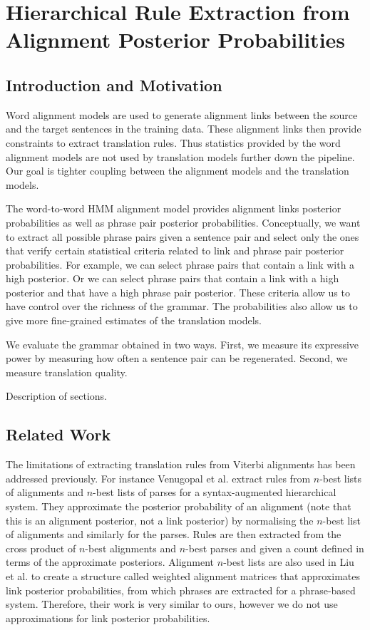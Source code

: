 \chapter{Hierarchical Rule Extraction from Alignment Posterior Probabilities}
\label{chap:extractionFromPosterior}

\section{Introduction and Motivation}
\label{sec:intro}

Word alignment models are used to generate alignment links between
the source and the target sentences in the training data. These
alignment links then provide constraints to extract translation
rules. Thus statistics provided by the word alignment models are
not used by translation models further down the pipeline.
Our goal is tighter coupling between the alignment models and the
translation models.

The word-to-word HMM alignment model provides alignment links
posterior probabilities as well as phrase pair posterior
probabilities. Conceptually, we want to extract all possible phrase pairs given
a sentence pair and select only the ones that verify certain statistical
criteria related to link and phrase pair posterior probabilities. For
example, we can select phrase pairs that contain a link with a high posterior.
Or we can select phrase pairs that contain a link with a high posterior
and that have a high phrase pair posterior. These criteria allow us
to have control over the richness of the grammar. The probabilities
also allow us to give more fine-grained estimates of the translation
models.

We evaluate the grammar obtained in two ways. First, we measure
its expressive power by measuring how often a sentence pair
can be regenerated. Second, we measure translation quality.

Description of sections.

\section{Related Work}

  The limitations of extracting translation rules from Viterbi alignments has been addressed previously.
  For instance Venugopal et al.  extract rules
  from $n$-best lists of alignments and $n$-best lists of parses for a syntax-augmented hierarchical system. They
  approximate the posterior probability of an alignment (note that this is an alignment posterior, not a link posterior) by
  normalising the $n$-best list of alignments and similarly for the parses. Rules are then extracted from the cross product
  of $n$-best alignments and $n$-best parses and given a count defined in terms of the approximate posteriors.
  Alignment $n$-best lists are also used in Liu et al.  to create a structure called weighted alignment
  matrices that approximates link posterior probabilities, from which phrases are extracted
  for a phrase-based system. Therefore, their work is very similar to ours, however we do not use approximations for link posterior probabilities.

